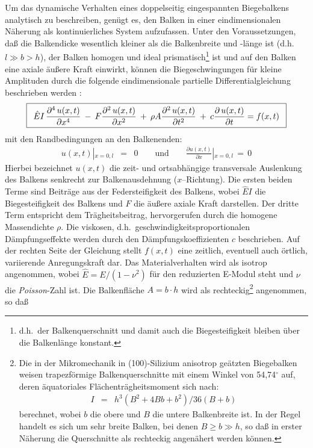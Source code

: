 Um das dynamische Verhalten eines doppelseitig eingespannten Biegebalkens
analytisch zu beschreiben, genügt es, den Balken in
einer eindimensionalen Näherung als konti\-nuierliches System aufzufassen.
Unter den Voraussetzungen, daß die Balkendicke wesentlich kleiner als die
Balkenbreite und -länge ist (d.h.\ $l \gg b > h$), der Balken
homogen und ideal prismatisch\footnote{d.h.\ der Balkenquerschnitt und damit
auch die Biegesteifigkeit bleiben über die Balkenlänge konstant.} ist und auf
den Balken eine axiale äußere Kraft einwirkt, können die Biegeschwingungen
für kleine Amplituden durch die folgende eindimensionale
partielle Differentialgleichung beschrieben werden \cite{Wea90}:
%
\begin{equation}
\label{balkdgl}
\fbox{$
 \displaystyle
 \begin{array}{rcl}
  \hat E I \, \displaystyle \frac{\partial^{4} \, u(x,t)}{\partial x^{4}}
  \: - \:
  F \displaystyle \frac{ \partial ^{2} \, u(x,t)}{\partial x^{2}}
  \: + \:
  \rho A \displaystyle \frac{\partial ^{2} \, u(x,t)}{\partial t^{2}}
  \: + \:
  c \displaystyle \frac{\partial \, u(x,t)}{\partial t}
  = f(x,t)
 \end{array}
 $}
\end{equation}
%
mit den Randbedingungen an den Balkenenden:
%
\begin{eqnarray*}
  \displaystyle  u(x,t) \left |_{x=0,l} \right. & = & 0
  \qquad \mbox{und} \qquad
  \displaystyle \frac{ \partial u(x,t) }{\partial x} \displaystyle
  \left |_{x=0,l} \right. \, = \, 0
\end{eqnarray*}
%
Hierbei bezeichnet $u(x,t)$ die zeit- und ortsabhängige transversale
Auslenkung des Balkens senkrecht zur Balkenausdehnung ($x$--Richtung).
Die ersten beiden Terme sind Beiträge aus der
Federsteifigkeit des Balkens, wobei $\hat E I$ die Biegesteifigkeit des
Balkens und $F$ die äußere axiale Kraft darstellen. Der dritte Term
entspricht dem Trägheitsbeitrag, hervorgerufen durch die
homogene Massendichte $\rho$. Die viskosen, d.h.\
geschwindigkeitsproportionalen Dämpfungseffekte werden
durch den Dämpfungskoeffizienten $c$ beschrieben. Auf der rechten Seite
der Gleichung stellt $f(x,t)$ eine zeitlich, eventuell auch örtlich,
variierende Anregungskraft dar. Das Materialverhalten wird als isotrop
angenommen, wobei $\hat E = E / (1-\nu^{2})$ für den
reduzierten E-Modul steht und $\nu$ die {\sl Poisson}-Zahl ist.
Die Balkenfläche $A = b \cdot h$ wird als rechteckig\footnote{Die in der
Mikromechanik in (100)-Silizium anisotrop geätzten Biegebalken weisen
trapezförmige Balkenquerschnitte mit einem Winkel von 54,74$^{\circ}$ auf,
deren äquatoriales Flächenträgheitsmoment sich nach:
\begin{eqnarray}
 I & = & h^{3}(B^2+4Bb+b^2)/36(B+b)
\end{eqnarray}
berechnet, wobei $b$ die obere und $B$
die untere Balkenbreite ist. In der Regel handelt es sich um sehr breite
Balken, bei denen $B \geq b \gg h$, so daß in erster Näherung die
Querschnitte als rechteckig angenähert werden können.} angenommen, so daß
